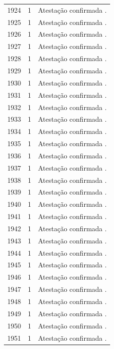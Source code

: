 \begin{longtable}{rrp{}}
1924 & 1 & Atestação confirmada \cite{anual1924}. \\
1925 & 1 & Atestação confirmada \cite{portugal1925}. \\
1926 & 1 & Atestação confirmada \cite{anual1926}. \\
1927 & 1 & Atestação confirmada \cite{anual1927}. \\
1928 & 1 & Atestação confirmada \cite{diarionacional1928}. \\
1929 & 1 & Atestação confirmada \cite{anual1929}. \\
1930 & 1 & Atestação confirmada \cite{anual1930}. \\
1931 & 1 & Atestação confirmada \cite{anual1931}. \\
1932 & 1 & Atestação confirmada \cite{anual1932}. \\
1933 & 1 & Atestação confirmada \cite{anual1933}. \\
1934 & 1 & Atestação confirmada \cite{anual1934}. \\
1935 & 1 & Atestação confirmada \cite{ticotico1935}. \\
1936 & 1 & Atestação confirmada \cite{anual1936}. \\
1937 & 1 & Atestação confirmada \cite{anual1937}. \\
1938 & 1 & Atestação confirmada \cite{anual1938}. \\
1939 & 1 & Atestação confirmada \cite{anual1939}. \\
1940 & 1 & Atestação confirmada \cite{anual1940}. \\
1941 & 1 & Atestação confirmada \cite{carioca1941}. \\
1942 & 1 & Atestação confirmada \cite{anual1942}. \\
1943 & 1 & Atestação confirmada \cite{anual1943}. \\
1944 & 1 & Atestação confirmada \cite{anual1944}. \\
1945 & 1 & Atestação confirmada \cite{anual1945}. \\
1946 & 1 & Atestação confirmada \cite{anual1946}. \\
1947 & 1 & Atestação confirmada \cite{jornalnoticias1947}. \\
1948 & 1 & Atestação confirmada \cite{anual1948}. \\
1949 & 1 & Atestação confirmada \cite{anual1949}. \\
1950 & 1 & Atestação confirmada \cite{anual1950}. \\
1951 & 1 & Atestação confirmada \cite{anual1951}. \\

\end{longtable}
